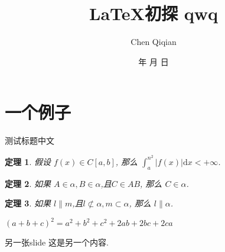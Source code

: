 \documentclass[UTF-8]{beamer} %
\begin{document}
    \renewcommand{\today}{\number\year 年 \number\month 月 \number\day 日}
    \newtheorem{thm}{定理}[section]
     
    \title[\LaTeX~初探 qwq]{\LaTeX 初探 qwq}
    \author{Chen Qiqian}
    \date{\today}
     
    \frame{\titlepage}
    \frame{\tableofcontents}
     
    \section{一个例子}

    \begin{frame}[t]{测试标题中文}
    \begin{thm}
      假设 $f(x)\in C[a,b]$, 那么 $\int_a^{n^2} |f(x)| \mathrm{d}x<+\infty$.
    \end{thm}
    \pause
    \begin{thm}
        如果 $A \in \alpha, B \in \alpha$,且$C \in AB $, 那么 $C \in \alpha$.
    \end{thm}
    \begin{thm}
        如果 $l \parallel m$,且$l \not\subset \alpha ,m\subset \alpha $, 那么 $l \parallel \alpha$.
    \end{thm}
    \textit{$ (a+b+c)^2 = a^2 + b^2 + c^2 + 2ab + 2bc +2ca$}
    \end{frame}
     
    \begin{frame}[fragile]{另一张slide}%
        这是另一个内容.
    \end{frame}

    
\end{document}
